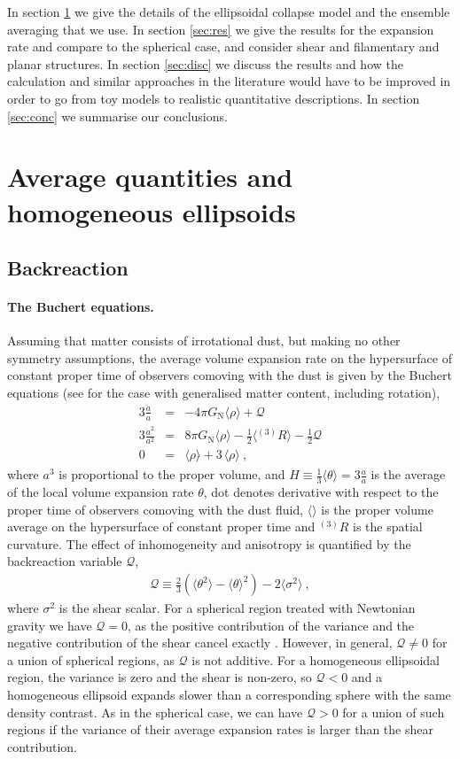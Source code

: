 \documentclass[11pt, a4paper]{article}
\newcommand{\bea}{\begin{eqnarray}} \newcommand{\eea}{\end{eqnarray}}
\renewcommand{\sec}[1]{section \ref{#1}}
\newcommand{\para}{\paragraph}
\newcommand{\GN}{G_{\mathrm{N}}}
\newcommand{\adot}{\dot{a}}
\newcommand{\addot}{\ddot{a}}
\newcommand{\av}[1]{\langle{#1}\rangle}
\newcommand{\sQ}{\mathcal{Q}}
\newcommand{\sR}{{^{(3)}R}}
\begin{document}
In \sec{sec:av} we give the details of the ellipsoidal collapse model and the ensemble averaging that we use. In \sec{sec:res} we give the results for the expansion rate and compare to the spherical case, and consider shear and filamentary and planar structures. In \sec{sec:disc} we discuss the results and how the calculation and similar approaches in the literature would have to be improved in order to go from toy models to realistic quantitative descriptions. In \sec{sec:conc} we summarise our conclusions.

\section{Average quantities and homogeneous ellipsoids} \label{sec:av}

\subsection{Backreaction} \label{sec:Buchert}

\para{The Buchert equations.}

Assuming that matter consists of irrotational dust, but making no other symmetry assumptions, the average volume expansion rate on the hypersurface of constant proper time of observers comoving with the dust is given by the Buchert equations \cite{Buchert:1999er} (see \cite{Buchert:2001sa, Larena:2009md, Rasanen:2009uw} for the case with generalised matter content, including rotation),
\bea
  \label{Ray} 3 \frac{\addot}{a} &=& - 4 \pi\GN \av{\rho} + \sQ \\
  \label{Ham} 3 \frac{\adot^2}{a^2} &=& 8 \pi\GN \av{\rho} - \frac{1}{2} \av{\sR} - \frac{1}{2}\sQ \\
  \label{cons} 0 &=& \av{\rho}\dot{} + 3 \frac{}{} \av{\rho} \ ,
\eea
%
where $a^3$ is proportional to the proper volume, and $H\equiv\frac{1}{3}\av{\theta}=3\frac{\adot}{a}$ is the average of the local volume expansion rate $\theta$, dot denotes derivative with respect to the proper time of observers comoving with the dust fluid, $\av{}$ is the proper volume average on the hypersurface of constant proper time and $\sR$ is the spatial curvature. The effect of inhomogeneity and anisotropy is quantified by the backreaction variable $\sQ$,
\bea \label{Q}
  \sQ \equiv \frac{2}{3}\left( \av{\theta^2} - \av{\theta}^2 \right) - 2 \av{\sigma^2} \ ,
\eea
%
where $\sigma^2$ is the shear scalar. For a spherical region treated with Newtonian gravity we have $\sQ=0$, as the positive contribution of the variance and the negative contribution of the shear cancel exactly \cite{Buchert:1999pq}. However, in general, $\sQ\neq0$ for a union of spherical regions, as $\sQ$ is not additive. For a homogeneous ellipsoidal region, the variance is zero and the shear is non-zero, so $\sQ<0$ and a homogeneous ellipsoid expands slower than a corresponding sphere with the same density contrast. As in the spherical case, we can have $\sQ>0$ for a union of such regions if the variance of their average expansion rates is larger than the shear contribution.
\end{document}
